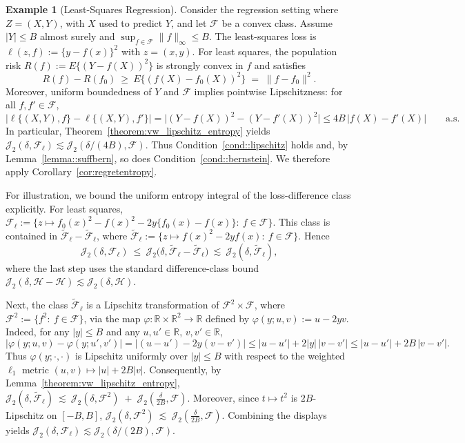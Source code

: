 \documentclass[11pt]{article}
\theoremstyle{plain}
\theoremstyle{definition} %
\newtheorem{example}{Example} %
\begin{document}
\begin{example}[Least-Squares Regression]
Consider the regression setting where \(Z=(X,Y)\), with \(X\) used to predict \(Y\), and let \(\mathcal F\) be a convex class.
Assume \(|Y|\le B\) almost surely and \(\sup_{f\in\mathcal F}\|f\|_\infty \le B\).
The least-squares loss is \(\ell(z,f):=\{y-f(x)\}^2\) with \(z=(x,y)\). For least squares, the population risk \(R(f):=E\{(Y-f(X))^2\}\) is strongly convex in \(f\) and satisfies
\[
R(f)-R(f_0)
\ \ge\
E\bigl\{(f(X)-f_0(X))^2\bigr\}
\;=\;
\|f-f_0\|^2.
\]
Moreover, uniform boundedness of \(Y\) and \(\mathcal F\) implies pointwise Lipschitzness: for all \(f,f'\in\mathcal F\),
\[
\bigl|\ell\{(X,Y),f\}-\ell\{(X,Y),f'\}\bigr|
=
\bigl|(Y-f(X))^2-(Y-f'(X))^2\bigr|
\le
4B\,|f(X)-f'(X)|
\qquad\text{a.s.}
\]
In particular, Theorem~\ref{theorem:vw_lipschitz_entropy} yields
\(\mathcal J_2(\delta,\mathcal F_{\ell}) \lesssim \mathcal J_2(\delta/(4B),\mathcal F)\). Thus Condition~\ref{cond::lipschitz} holds and, by Lemma~\ref{lemma::suffbern}, so does Condition~\ref{cond::bernstein}.
We therefore apply Corollary~\ref{cor:regretentropy}.  



For illustration, we bound the uniform entropy integral of the loss-difference class explicitly. For least squares, $\mathcal F_{\ell}
:=
\{z \mapsto f_0(x)^2 - f(x)^2 - 2y\{f_0(x)-f(x)\}:\ f \in \mathcal F\}.$
This class is contained in \(\widetilde{\mathcal F}_{\ell}-\widetilde{\mathcal F}_{\ell}\), where
\(\widetilde{\mathcal F}_{\ell}:=\{z \mapsto f(x)^2 - 2y f(x):\ f \in \mathcal F\}\). Hence
\[
\mathcal J_2(\delta,\mathcal F_{\ell})
\ \le\
\mathcal J_2\bigl(\delta,\widetilde{\mathcal F}_{\ell}-\widetilde{\mathcal F}_{\ell}\bigr)
\ \lesssim\
\mathcal J_2(\delta,\widetilde{\mathcal F}_{\ell}),
\]
where the last step uses the standard difference-class bound
\(\mathcal J_2(\delta,\mathcal H-\mathcal H)\lesssim \mathcal J_2(\delta,\mathcal H)\).


Next, the class \(\widetilde{\mathcal F}_{\ell}\) is a Lipschitz transformation of \(\mathcal F^2\times \mathcal F\), where
\(\mathcal F^2:=\{f^2:\ f\in\mathcal F\}\), via the map \(\varphi:\mathbb R\times\mathbb R^2\to\mathbb R\) defined by
\(\varphi(y;u,v):=u-2y v\). Indeed, for any \(|y|\le B\) and any \(u,u'\in\mathbb R\), \(v,v'\in\mathbb R\),
\[
|\varphi(y;u,v)-\varphi(y;u',v')|
=
|(u-u')-2y(v-v')|
\le
|u-u'| + 2|y|\,|v-v'|
\le
|u-u'| + 2B\,|v-v'|.
\]
Thus \(\varphi(y;\cdot,\cdot)\) is Lipschitz uniformly over \(|y|\le B\) with respect to the weighted \(\ell_1\) metric
\((u,v)\mapsto |u|+2B|v|\). Consequently, by Lemma~\ref{theorem:vw_lipschitz_entropy}, $\mathcal J_2(\delta,\widetilde{\mathcal F}_{\ell})
\ \lesssim\
\mathcal J_2(\delta,\mathcal F^2)\;+\;\mathcal J_2\left(\frac{\delta}{2B},\mathcal F\right).$
Moreover, since \(t\mapsto t^2\) is \(2B\)-Lipschitz on \([-B,B]\), $\mathcal J_2(\delta,\mathcal F^2)
\ \lesssim\
\mathcal J_2\left(\frac{\delta}{2B},\mathcal F\right).$
Combining the displays yields \(\mathcal J_2(\delta,\mathcal F_{\ell})\lesssim \mathcal J_2\left(\delta/(2B),\mathcal F\right)\).


\end{example}
\end{document}
